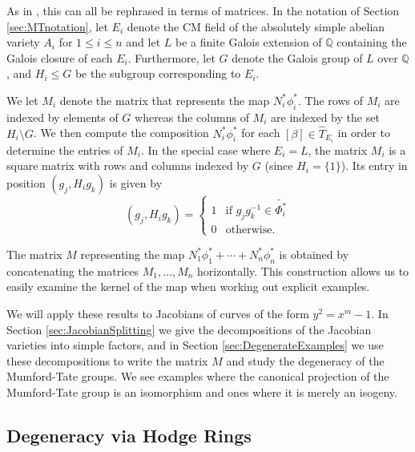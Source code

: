 \documentclass[reqno, oneside, 12pt]{amsart}
\newcommand{\Q}{\mathbb{Q}}
\theoremstyle{remark}
\numberwithin{equation}{section}
\begin{document}
As in \cite[Lemma 4.3]{Lombardo2021}, this can all be rephrased in terms of matrices. In the notation of Section \ref{sec:MTnotation}, let $E_i$ denote the CM field of the absolutely simple abelian variety $A_i$ for $1\leq i\leq n$ and let $L$ be a finite Galois extension of $\mathbb Q$ containing the Galois closure of each $E_i$. Furthermore, let $G$ denote the Galois group of $L$ over $\Q$, and $H_i\leq G$ be the subgroup corresponding to $E_i$. 

We let $M_i$ denote the matrix that represents the map  $N_i^* \phi_i^*$. The rows of $M_i$ are indexed by elements of $G$ whereas the columns of $M_i$ are indexed by the set $H_i\setminus G$. We then compute the composition $N_i^*\phi_i^*$ for each $[\beta]\in \widehat{T}_{E_i}$ in order to determine the entries of $M_i$. In the special case where $E_i=L$, the matrix $M_i$ is a square matrix with rows and columns indexed by $G$ (since $H_i=\{1\}$). Its entry in position $(g_j,H_i g_k)$ is given by
\[(g_j,H_i g_k)=\begin{cases}1&\text{if } g_jg_k^{-1}\in \widetilde{\Phi_i^*}\\
0&\text{otherwise.}
\end{cases}
\]

The matrix $M$ representing the map $N_1^* \phi_1^* +\cdots+ N_n^*\phi_n^*$ is obtained by concatenating the matrices $M_1, \ldots, M_n$ horizontally. This construction allows us to easily examine the kernel of the map when working out explicit examples. 


We will apply these results to Jacobians of curves of the form $y^2=x^m-1$. In Section \ref{sec:JacobianSplitting} we give the decompositions of the Jacobian varieties into simple factors, and in Section  \ref{sec:DegenerateExamples} we use these decompositions to write the matrix $M$ and study the degeneracy of the Mumford-Tate groups. We see examples where the canonical projection of the Mumford-Tate group is an isomorphism and ones where it is merely an isogeny.













\subsection{Degeneracy via Hodge Rings}\label{sec:DegeneracyHodgeRing}
\end{document}
